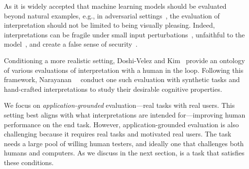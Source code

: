 As it is widely accepted that machine learning models should be
evaluated beyond natural examples, e.g., in adversarial
settings~\cite{goodfellow2014explaining, jia2017adversarial},
the evaluation of interpretation should not be limited to being
visually pleasing. Indeed, interpretations can be fragile under small
input perturbations~\cite{ghorbani2017interpretation,
kindermans2017unreliability}, unfaithful to the
model~\cite{hooker2018evaluating, adebayo2018sanity, feng2018rawr},
and create a false sense of security~\cite{jiang2018trust}.

Conditioning a more realistic setting, Doshi-Velez and
Kim~\cite{doshivelez2017towards}
provide an ontology of various evaluations of interpretation with a
human in the loop. Following this framework,
Narayanan~\etal{}~\cite{narayanan2018humans} conduct
one such evaluation with synthetic tasks and hand-crafted
interpretations to study their desirable cognitive properties.

We focus on \emph{application-grounded} evaluation---real tasks with
real users.  This setting best aligns with what interpretations are
intended for---improving human performance on the end task.  However,
application-grounded evaluation is also challenging because it
requires real tasks and motivated real users. The task needs a large
pool of willing human testers, and ideally one that challenges both
humans and computers. As we discuss in the next section, \qb{} is a
task that satisfies these conditions.
